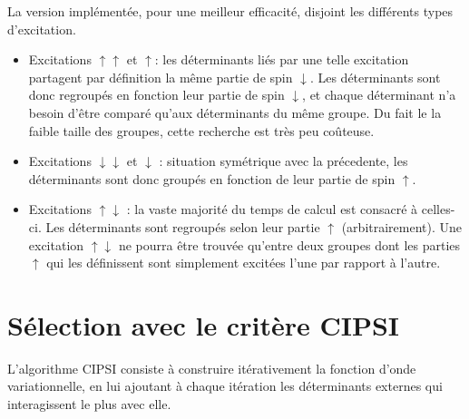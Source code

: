 \documentclass[./thesis.tex]{subfiles}
\begin{document}
La version implémentée, pour une meilleur efficacité, disjoint les différents types d'excitation.
\begin{itemize}
\item
Excitations $\uparrow \uparrow$ et $\uparrow$: les déterminants liés par une telle excitation partagent par définition la même partie de spin $\downarrow$. Les déterminants sont donc regroupés en fonction leur partie de spin $\downarrow$, et chaque déterminant n'a besoin d'être comparé qu'aux déterminants du même groupe. Du fait le la faible taille des groupes, cette recherche est très peu coûteuse.
\item
Excitations $\downarrow \downarrow$ et $\downarrow$ : situation symétrique avec la précedente, les déterminants sont donc groupés en fonction de leur partie de spin $\uparrow$.
\item
Excitations $\uparrow \downarrow$ : la vaste majorité du temps de calcul est consacré à celles-ci. Les déterminants sont regroupés selon leur partie $\uparrow$ (arbitrairement). Une excitation $\uparrow \downarrow$ ne pourra être trouvée qu'entre deux groupes dont les parties $\uparrow$ qui les définissent sont simplement excitées l'une par rapport à l'autre.
\end{itemize}
\section{Sélection avec le critère CIPSI}

L'algorithme CIPSI consiste à construire itérativement la fonction d'onde variationnelle, en lui ajoutant à chaque itération les déterminants externes qui interagissent le plus avec elle.
\end{document}
